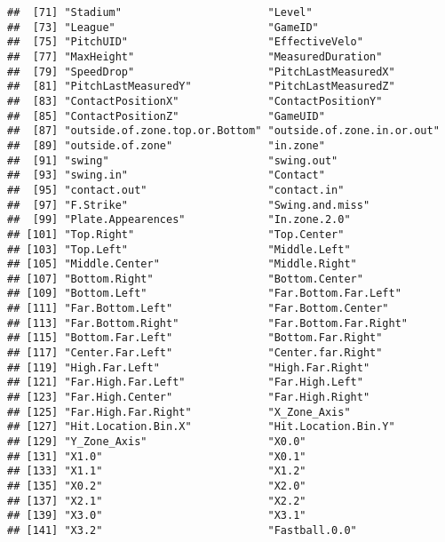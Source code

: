 \documentclass[]{article}
\begin{document}
\begin{verbatim}
##  [71] "Stadium"                       "Level"                        
##  [73] "League"                        "GameID"                       
##  [75] "PitchUID"                      "EffectiveVelo"                
##  [77] "MaxHeight"                     "MeasuredDuration"             
##  [79] "SpeedDrop"                     "PitchLastMeasuredX"           
##  [81] "PitchLastMeasuredY"            "PitchLastMeasuredZ"           
##  [83] "ContactPositionX"              "ContactPositionY"             
##  [85] "ContactPositionZ"              "GameUID"                      
##  [87] "outside.of.zone.top.or.Bottom" "outside.of.zone.in.or.out"    
##  [89] "outside.of.zone"               "in.zone"                      
##  [91] "swing"                         "swing.out"                    
##  [93] "swing.in"                      "Contact"                      
##  [95] "contact.out"                   "contact.in"                   
##  [97] "F.Strike"                      "Swing.and.miss"               
##  [99] "Plate.Appearences"             "In.zone.2.0"                  
## [101] "Top.Right"                     "Top.Center"                   
## [103] "Top.Left"                      "Middle.Left"                  
## [105] "Middle.Center"                 "Middle.Right"                 
## [107] "Bottom.Right"                  "Bottom.Center"                
## [109] "Bottom.Left"                   "Far.Bottom.Far.Left"          
## [111] "Far.Bottom.Left"               "Far.Bottom.Center"            
## [113] "Far.Bottom.Right"              "Far.Bottom.Far.Right"         
## [115] "Bottom.Far.Left"               "Bottom.Far.Right"             
## [117] "Center.Far.Left"               "Center.far.Right"             
## [119] "High.Far.Left"                 "High.Far.Right"               
## [121] "Far.High.Far.Left"             "Far.High.Left"                
## [123] "Far.High.Center"               "Far.High.Right"               
## [125] "Far.High.Far.Right"            "X_Zone_Axis"                  
## [127] "Hit.Location.Bin.X"            "Hit.Location.Bin.Y"           
## [129] "Y_Zone_Axis"                   "X0.0"                         
## [131] "X1.0"                          "X0.1"                         
## [133] "X1.1"                          "X1.2"                         
## [135] "X0.2"                          "X2.0"                         
## [137] "X2.1"                          "X2.2"                         
## [139] "X3.0"                          "X3.1"                         
## [141] "X3.2"                          "Fastball.0.0"                 

\end{verbatim}
\end{document}
